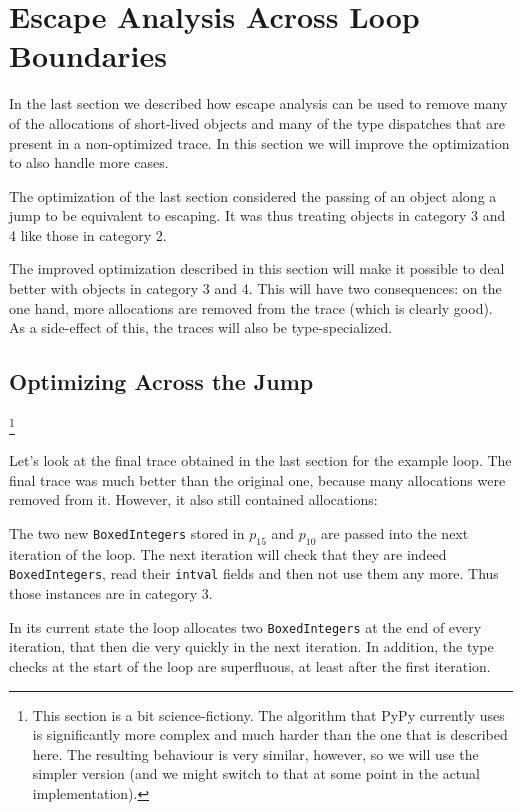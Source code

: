 \documentclass{sigplanconf}
\begin{document}
\section{Escape Analysis Across Loop Boundaries}
\label{sec:crossloop}

In the last section we described how escape analysis can be used to remove
many of the allocations of short-lived objects and many of the type dispatches
that are present in a non-optimized trace. In this section we will improve the
optimization to also handle more cases.

The optimization of the last section considered the passing of an object along a
jump to be equivalent to escaping. It was thus treating objects in category 3
and 4 like those in category 2.

The improved optimization described in this section will make it possible to deal
better with objects in category 3 and 4. This will have two consequences: on
the one hand, more allocations are removed from the trace (which is clearly
good). As a side-effect of this, the traces will also be type-specialized.



\subsection{Optimizing Across the Jump}

\footnote{This section is a bit
science-fictiony. The algorithm that PyPy currently uses is significantly more
complex and much harder than the one that is described here. The resulting
behaviour is very similar, however, so we will use the simpler version (and we
might switch to that at some point in the actual implementation).}

Let's look at the final trace obtained in the last section for the example loop.
The final trace was much better than the original one, because many allocations
were removed from it. However, it also still contained allocations:

The two new \texttt{BoxedIntegers} stored in $p_{15}$ and $p_{10}$ are passed into
the next iteration of the loop. The next iteration will check that they are
indeed \texttt{BoxedIntegers}, read their \texttt{intval} fields and then not use them
any more. Thus those instances are in category 3.

In its current state the loop
allocates two \texttt{BoxedIntegers} at the end of every iteration, that then die
very quickly in the next iteration. In addition, the type checks at the start
of the loop are superfluous, at least after the first iteration.
\end{document}
